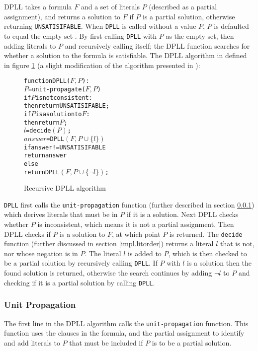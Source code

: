 DPLL takes a formula $F$ and a set of literals $P$ (described as a partial assignment), and returns a solution to $F$ if $P$ is a partial solution, 
otherwise returning \verb+UNSATISIFABLE+.
When \texttt{DPLL} is called without a value $P$, $P$ is defaulted to equal the empty set .
By first calling \texttt{DPLL} with $P$ as the empty set, then adding literals to $P$ and recursively calling itself; 
the DPLL function searches for whether a solution to the formula is satisfiable.
The DPLL algorithm in defined in figure \ref{impl.DPLL} (a slight modification of the algorithm presented in \citep{dixon2004automating}):
\begin{figure}[h]
\begin{center}
\begin{alltt}
function DPLL(\(F, P\)):
   \(P\) = unit-propagate(\(F, P\))
   if \(P\) is not consistent:
       then return UNSATISIFABLE;
   if \(P\) is a solution to \(F\):
       then return \(P\);
   \(l\) = decide\((P)\);
   \(answer\) = DPLL\((F, P \cup \{l\})\)
   if answer != UNSATISIFABLE 
       return answer
   else
       return DPLL\((F, P \cup \{\neg l\})\);
\end{alltt}
  \caption{Recursive DPLL algorithm}
  \label{impl.DPLL}
\end{center}
\end{figure}

\texttt{DPLL} first calls the \texttt{unit-propagation} function (further described in section \ref{impl.unit}) which derives literals that must be in $P$ if it is a solution.
Next DPLL checks whether $P$ is inconsistent, which means it is not a partial assignment.
Then DPLL checks if $P$ is a solution to $F$, at which point $P$ is returned.
The \texttt{decide} function (further discussed in section \ref{impl.litorder}) returns a literal $l$ that is not, nor whose negation is in $P$.
The literal $l$ is added to $P$, which is then checked to be a partial solution by recursively calling \texttt{DPLL}.
If $P$ with $l$ is a solution then the found solution is returned,
otherwise the search continues by adding $\neg l$ to $P$ and checking if it is a partial solution by calling \texttt{DPLL}.

\subsubsection{Unit Propagation}
\label{impl.unit}
The first line in the  DPLL algorithm calls the \texttt{unit-propagation} function.
This function uses the clauses in the formula, and the partial assignment to identify and add literals to $P$ that must be included if $P$ is to be a partial solution.

